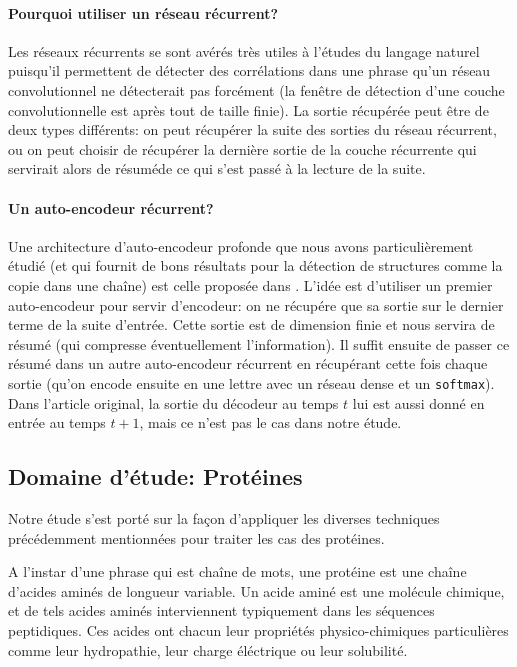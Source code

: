 \documentclass[a4paper, 11pt, onecolumn]{article}
\begin{document}
\paragraph{Pourquoi utiliser un réseau récurrent?}

Les réseaux récurrents se sont avérés très utiles à l'études du langage naturel
puisqu'il permettent de détecter des corrélations dans une phrase qu'un réseau
convolutionnel ne détecterait pas forcément (la fenêtre de détection d'une
couche convolutionnelle est après tout de taille finie).  La sortie récupérée
peut être de deux types différents: on peut récupérer la suite des sorties du
réseau récurrent, ou on peut choisir de récupérer la dernière sortie de la
couche récurrente qui servirait alors de \og résumé\fg de ce qui s'est passé à
la lecture de la suite.

\paragraph{Un auto-encodeur récurrent?}

Une architecture d'auto-encodeur profonde que nous avons particulièrement étudié
(et qui fournit de bons résultats pour la détection de structures comme la copie
dans une chaîne) est celle proposée dans \cite{DBLP:journals/corr/ChoMGBSB14}.
L'idée est d'utiliser un premier auto-encodeur pour servir d'encodeur: on ne
récupére que sa sortie sur le dernier terme de la suite d'entrée. Cette sortie
est de dimension finie et nous servira de résumé (qui compresse éventuellement
l'information). Il suffit ensuite de passer ce résumé dans un autre
auto-encodeur récurrent en récupérant cette fois chaque sortie (qu'on encode
ensuite en une lettre avec un réseau dense et un \texttt{softmax}). Dans
l'article original, la sortie du décodeur au temps $t$ lui est aussi donné en
entrée au temps $t+1$, mais ce n'est pas le cas dans notre étude.

\subsection{Domaine d'étude: Protéines}

Notre étude s'est porté sur la façon d'appliquer les diverses techniques
précédemment mentionnées pour traiter les cas des protéines.

A l'instar d'une phrase qui est chaîne de mots, une protéine est une chaîne
d'acides aminés de longueur variable. Un acide aminé est une molécule chimique,
et de tels acides aminés interviennent typiquement dans les séquences
peptidiques. Ces acides ont chacun leur propriétés physico-chimiques
particulières comme leur hydropathie, leur charge éléctrique ou leur solubilité.
\end{document}
